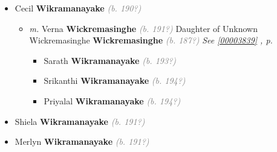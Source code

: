 \documentclass[10pt, openany]{book}
\begin{document}
\begin{itemize}
{\begin{itemize}
{\begin{itemize}
{\begin{itemize}
{\begin{itemize}
{\begin{itemize}
\item{Shanika \textbf{Wikramanayake} \textcolor{gray}{\textit{(b. 193?)}}
 }
\item{Sri Nath \textbf{Wikramanayake} \textcolor{gray}{\textit{(b. 193?)}}
\begin{itemize}
\item{\textit{m.}  \textbf{Narmali} \textcolor{gray}{\textit{(b. 194?)}}   \label{couple:00003833:00003834} \begin{itemize}
\item{Yanik \textbf{Wikramanayake} \textcolor{gray}{\textit{(b. 197?)}}
 }
\item{Anik \textbf{Wikramanayake} \textcolor{gray}{\textit{(b. 197?)}}
 }
\end{itemize}}
\end{itemize}
  }
\end{itemize}}
\end{itemize}
 }
\item{Cecil \textbf{Wikramanayake} \textcolor{gray}{\textit{(b. 190?)}}
\begin{itemize}
\item{\textit{m.} Verna \textbf{Wickremasinghe} \textcolor{gray}{\textit{(b. 191?)}} Daughter of  Unknown Wickremasinghe \textbf{Wickremasinghe} \textcolor{gray}{\textit{(b. 187?)}} \textcolor{slteal}{\textit{See  \autoref{00003839} \textit{, p. \pageref{00003839} }}}   \label{couple:00003837:00003838} \begin{itemize}
\item{Sarath \textbf{Wikramanayake} \textcolor{gray}{\textit{(b. 193?)}}
 }
\item{Srikanthi \textbf{Wikramanayake} \textcolor{gray}{\textit{(b. 194?)}}
 }
\item{Priyalal \textbf{Wikramanayake} \textcolor{gray}{\textit{(b. 194?)}}
 }
\end{itemize}}
\end{itemize}
 }
\item{Shiela \textbf{Wikramanayake} \textcolor{gray}{\textit{(b. 191?)}}
 }
\item{Merlyn \textbf{Wikramanayake} \textcolor{gray}{\textit{(b. 191?)}}
 }

\end{itemize}}
\end{itemize}}
\end{itemize}}
\end{itemize}
\end{document}
